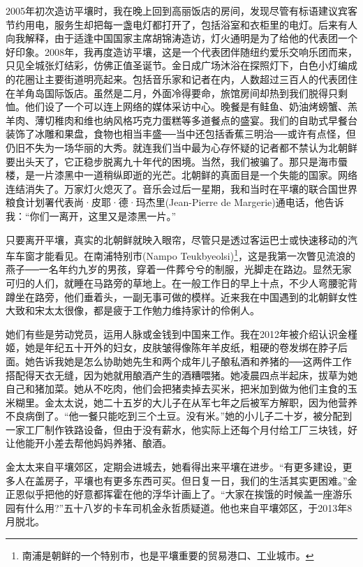 2005年初次造访平壤时，我在晚上回到高丽饭店的房间，发现尽管有标语建议宾客节约用电，服务生却把每一盏电灯都打开了，包括浴室和衣柜里的电灯。后来有人向我解释，由于适逢中国国家主席胡锦涛造访，灯火通明是为了给他的代表团一个好印象。2008年，我再度造访平壤，这是一个代表团伴随纽约爱乐交响乐团而来，只见全城张灯结彩，仿佛正值圣诞节。金日成广场沐浴在探照灯下，白色小灯编成的花圈让主要街道明亮起来。包括音乐家和记者在内，人数超过三百人的代表团住在羊角岛国际饭店。虽然是二月，外面冷得要命，旅馆房间却热到我们脱得只剩恤。他们设了一个可以连上网络的媒体采访中心。晚餐是有鲑鱼、奶油烤螃蟹、羔羊肉、薄切稚肉和维也纳风格巧克力蛋糕等多道餐点的盛宴。我们的自助式早餐台装饰了冰雕和果盘，食物也相当丰盛──当中还包括香蕉三明治──或许有点怪，但仍旧不失为一场华丽的大秀。就连我们当中最为心存怀疑的记者都不禁认为北朝鲜要出头天了，它正稳步脱离九十年代的困境。当然，我们被骗了。那只是海市蜃楼，是一片漆黑中一道稍纵即逝的光芒。北朝鲜的真面目是一个失能的国家。网络连结消失了。万家灯火熄灭了。音乐会过后一星期，我和当时在平壤的联合国世界粮食计划署代表尚·皮耶·德·玛杰里(Jean-Pierre de Margerie)通电话，他告诉我：“你们一离开，这里又是漆黑一片。”

只要离开平壤，真实的北朝鲜就映入眼帘，尽管只是透过客运巴士或快速移动的汽车车窗才能看见。在南浦特别市(Nampo Teukbyeolsi)\footnote{南浦是朝鲜的一个特别市，也是平壤重要的贸易港口、工业城市。}，这是我第一次瞥见流浪的燕子──一名年约九岁的男孩，穿着一件葬兮兮的制服，光脚走在路边。显然无家可归的人们，就睡在马路旁的草地上。在一般工作日的早上十点，不少人弯腰驼背蹲坐在路旁，他们垂着头，一副无事可做的模样。近来我在中国遇到的北朝鲜女性大致和宋太太很像，都是疲于工作勉力维持家计的伶俐人。

她们有些是劳动党员，运用人脉或金钱到中国来工作。我在2012年被介绍认识金槿姬，她是年纪五十开外的妇女，皮肤皱得像陈年羊皮纸，粗硬的卷发绑在脖子后面。她告诉我她是怎么协助她先生和两个成年儿子酿私酒和养猪的──这两件工作搭配得天衣无缝，因为她就用酿酒产生的酒糟喂猪。她凌晨四点半起床，拔草为她自己和猪加菜。她从不吃肉，他们会把猪卖掉去买米，把米加到做为他们主食的玉米糊里。金太太说，她二十五岁的大儿子在从军七年之后被军方解职，因为他营养不良病倒了。“他一餐只能吃到三个土豆。没有米。”她的小儿子二十岁，被分配到一家工厂制作铁路设备，但由于没有薪水，他实际上还每个月付给工厂三块钱，好让他能开小差去帮他妈妈养猪、酿酒。

金太太来自平壤郊区，定期会进城去，她看得出来平壤在进步。“有更多建设，更多人在盖房子，平壤也有更多东西可买。但日复一日，我们的生活其实更困难。”金正恩似乎把他的好意都挥霍在他的浮华计画上了。“大家在挨饿的时候盖一座游乐园有什么用?”五十八岁的卡车司机金永哲质疑道。他也来自平壤郊区，于2013年8月脱北。

